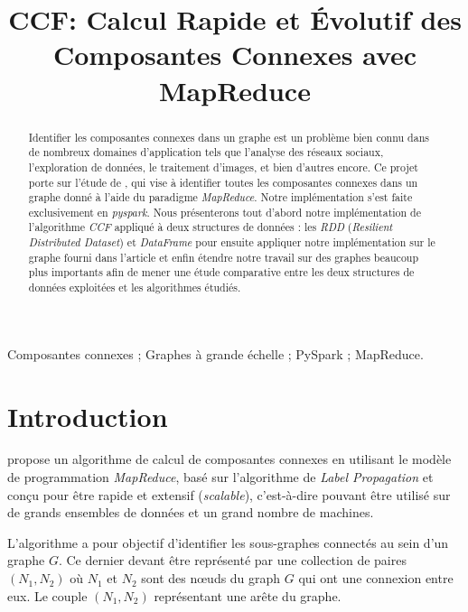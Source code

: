 \documentclass[conference]{IEEEtran}
\title{\LARGE \bf
CCF: Calcul Rapide et Évolutif des Composantes Connexes avec MapReduce
}
\author{
    \IEEEauthorblockN{Aurélien Duvignac-Rosa, Edoardo Piciucchi, Jean-Marc Fauvel}
}
\begin{document}
\pagestyle{fancy}
\fancyhf{}
\renewcommand{\headrulewidth}{0pt}
\renewcommand{\footrulewidth}{0pt}


\maketitle
\thispagestyle{empty}
\pagestyle{empty}


\begin{abstract}
Identifier les composantes connexes dans un graphe est un problème bien connu dans de nombreux domaines d'application tels que l'analyse des réseaux sociaux, l'exploration de données, le traitement d'images, et bien d'autres encore.
Ce projet porte sur l'étude de \cite{6785473}, qui vise à identifier toutes les composantes connexes dans un graphe donné à l'aide du paradigme \textit{MapReduce}.
Notre implémentation s'est faite exclusivement en \textit{pyspark}.
Nous présenterons tout d'abord notre implémentation de l'algorithme \textit{CCF} appliqué à deux structures de données : les \textit{RDD} (\textit{Resilient Distributed Dataset}) et \textit{DataFrame} pour ensuite appliquer notre implémentation sur le graphe fourni dans l'article \cite{6785473} et enfin étendre notre travail sur des graphes beaucoup plus importants afin de mener une étude comparative entre les deux structures de données exploitées et les algorithmes étudiés.
\end{abstract}
\begin{IEEEkeywords}
Composantes connexes ; Graphes à grande échelle ; PySpark ; MapReduce.
\end{IEEEkeywords}

\section{Introduction}
\cite{6785473} propose un algorithme de calcul de composantes connexes en utilisant le modèle de programmation \textit{MapReduce}, basé sur l'algorithme de \textit{Label Propagation} et conçu pour être rapide et extensif (\textit{scalable}), c'est-à-dire pouvant être utilisé sur de grands ensembles de données et un grand nombre de machines.

L'algorithme a pour objectif d'identifier les sous-graphes connectés au sein d'un graphe $G$. Ce dernier devant être représenté par une collection de paires $(N_{1}, N_{2})$ où $N_{1}$ et $N_{2}$ sont des nœuds du graph $G$ qui ont une connexion entre eux. Le couple $(N_{1}, N_{2})$ représentant une arête du graphe.
\end{document}
